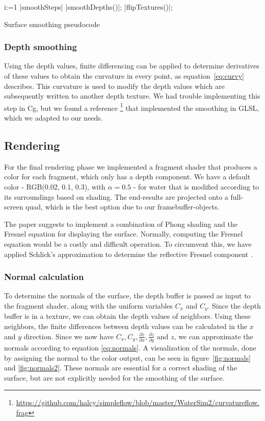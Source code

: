 \begin{algorithm}
	\begin{program}
	\caption
	\FOR i:=1 \TO |smoothSteps| \DO
		|smoothDepths()|;
		|flipTextures()|;
	\end{program}
	\label{program:smooth}
	\caption{Surface smoothing pseudocode}
\end{algorithm}


\subsubsection{Depth smoothing}
Using the depth values, finite differencing can be applied to determine derivatives of these values to obtain the curvature in every point, as equation~\ref{eq:curvy} describes.
This curvature is used to modify the depth values which are subsequently written to another depth texture.
We had trouble implementing this step in Cg, but we found a reference \footnote{\url{https://github.com/halcy/simpleflow/blob/master/WaterSim2/curvatureflow.frag}} that implemented the smoothing in GLSL, which we adapted to our needs.

\subsection{Rendering}
For the final rendering phase we implemented a fragment shader that produces a color for each fragment, which only has a depth component.
We have a default color - RGB(0.02, 0.1, 0.3), with $\alpha = 0.5$ - for water that is modified according to its surroundings based on shading. 
The end-results are projected onto a full-screen quad, which is the best option due to our framebuffer-objects.

The paper suggests to implement a combination of Phong shading and the Fresnel equation for displaying the surface. 
Normally, computing the Fresnel equation would be a costly and difficult operation.
To circumvent this, we have applied Schlick's approximation to determine the reflective Fresnel component \cite{schlick1994inexpensive}.

\subsubsection{Normal calculation}
To determine the normals of the surface, the depth buffer is passed as input to the fragment shader, along with the uniform variables $C_x$ and $C_y$.
Since the depth buffer is in a texture, we can obtain the depth values of neighbors.
Using these neighbors, the finite differences between depth values can be calculated in the $x$ and $y$ direction.
Since we now have $C_x, C_y, \frac{\partial z}{\partial x}, \frac{\partial z}{\partial y}$ and $z$, we can approximate the normals according to equation \ref{eq:normals}.
A visualization of the normals, done by assigning the normal to the color output, can be seen in figure~\ref{fig:normals} and \ref{fig:normals2}. 
These normals are essential for a correct shading of the surface, but are not explicitly needed for the smoothing of the surface.


